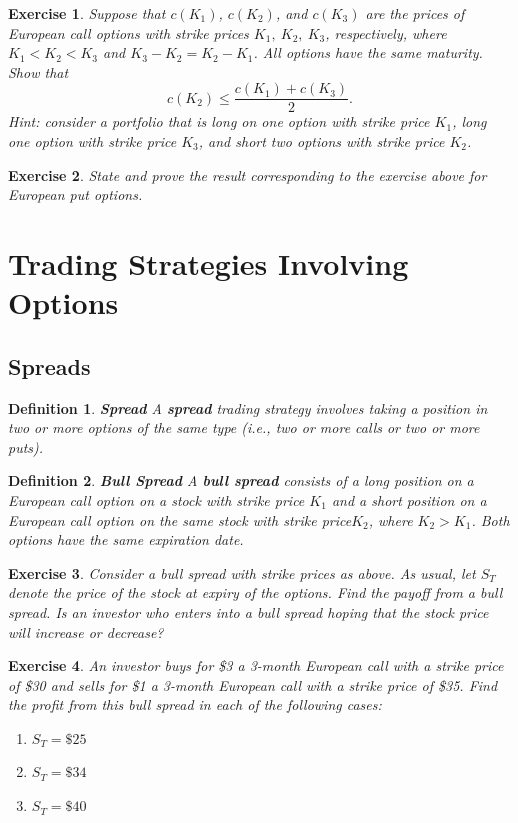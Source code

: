 \documentclass[letterpaper,10pt]{article}
\newtheorem{df}{Definition}[section]
\newtheorem{ex}{Exercise}
\begin{document}
\begin{ex}
Suppose that $c(K_1)$, $c(K_2)$, and $c(K_3)$ are the prices of European call options with strike prices $K_1,~K_2,~K_3$, respectively, where $K_1<K_2<K_3$ and $K_3-K_2=K_2-K_1$.  All options have the same maturity.  Show that $$c(K_2)\leq \frac{c(K_1)+c(K_3)}{2}.$$  Hint:  consider a portfolio that is long on one option with strike price $K_1$, long one option with strike price $K_3$, and short two options with strike price $K_2$.
\end{ex}

\begin{ex}
State and prove the result corresponding to the exercise above for European put options.
\end{ex}

\newpage



\section{Trading Strategies Involving Options}

\subsection{Spreads}

\begin{df}{\bf Spread}
A {\bf spread} trading strategy involves taking a position in two or more options of the same type (i.e., two or more calls or two or more puts).
\end{df}

\begin{df}{\bf Bull Spread}
A {\bf bull spread} consists of a long position on a European call option on a stock with strike price $K_1$ and a short position on a European call option on the same stock with strike price$K_2$, where $K_2>K_1$. Both options have the same expiration date.
\end{df}



\begin{ex}
Consider a bull spread with strike prices as above.  As usual, let $S_T$ denote the price of the stock at expiry of the options.  Find the payoff from a bull spread. Is an investor who enters into a bull spread hoping that the stock price will increase or decrease?
\end{ex}



\begin{ex}
An investor buys for \$3 a 3-month European call with a strike price of \$30 and sells for \$1 a 3-month European call with a strike price of \$35. Find the profit from this bull spread in each of the following cases:
\begin{enumerate}
\item[(a)] $S_T=\$25$
\item[(b)] $S_T=\$34$
\item[(c)] $S_T=\$40$
\end{enumerate}
\end{ex}
\end{document}
